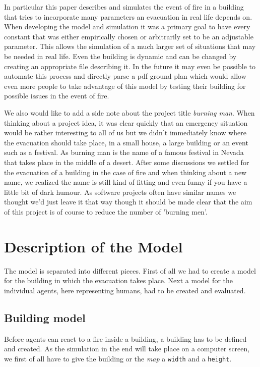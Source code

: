 \documentclass[11pt]{article}
\begin{document}
In particular this paper describes and simulates the event of fire in a building that tries to incorporate many parameters an evacuation in real life depends on. When developing the model and simulation it was a primary goal to have every constant that was either empirically chosen or arbitrarily set to be an adjustable parameter. This allows the simulation of a much larger set of situations that may be needed in real life. Even the building is dynamic and can be changed by creating an appropriate file describing it. In the future it may even be possible to automate this process and directly parse a pdf ground plan which would allow even more people to take advantage of this model by testing their building for possible issues in the event of fire.

We also would like to add a side note about the project title \textit{burning man}. When thinking about a project idea, it was clear quickly that an emergency situation would be rather interesting to all of us but we didn't immediately know where the evacuation should take place, in a small house, a large building or an event such as a festival. As burning man is the name of a famous festival in Nevada that takes place in the middle of a desert. After some discussions we settled for the evacuation of a building in the case of fire and when thinking about a new name, we realized the name is still kind of fitting and even funny if you have a little bit of dark humour. As software projects often have similar names we thought we'd just leave it that way though it should be made clear that the aim of this project is of course to reduce the number of 'burning men'.


\section{Description of the Model}

The model is separated into different pieces. First of all we had to create a model for the building in which the evacuation takes place. Next a model for the individual agents, here representing humans, had to be created and evaluated.

\subsection{Building model}

Before agents can react to a fire inside a building, a building has to be defined and created. As the simulation in the end will take place on a computer screen, we first of all have to give the building or the \textit{map} a \texttt{width} and a \texttt{height}.
\end{document}
